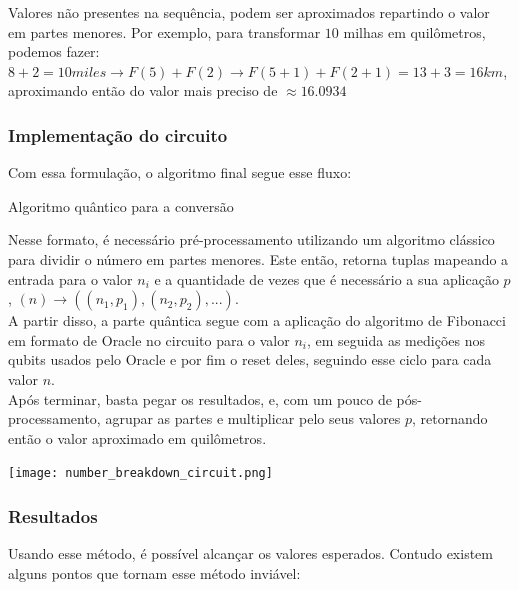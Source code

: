 \documentclass{article}
\begin{document}
Valores não presentes na sequência, podem ser aproximados repartindo o valor em partes menores. Por exemplo, para transformar $10$ milhas em quilômetros, podemos fazer: $8 + 2 = 10miles \to F(5) + F(2) \to F(5+1) + F(2+1) =  13 + 3 = 16km$, aproximando então do valor mais preciso de $\approx 16.0934$


\subsubsection{Implementação do circuito}
Com essa formulação, o algoritmo final segue esse fluxo:

\begin{algorithm}[H]
	\begin{algorithmic}
		\EndFor
			
	\end{algorithmic}
	\caption{Algoritmo quântico para a conversão}
	\label{alg:miles-to-km-quantum-algortihm}
\end{algorithm}


Nesse formato, é necessário pré-processamento utilizando um algoritmo clássico para dividir o número em partes menores. Este então, retorna tuplas mapeando a entrada para o valor $n_i$ e a quantidade de vezes que é necessário a sua aplicação $p$, $(n) \to ((n_1, p_1), (n_2, p_2), ...)$.\\
A partir disso, a parte quântica segue com a aplicação do algoritmo de Fibonacci em formato de Oracle no circuito para o valor $n_i$, em seguida as medições nos qubits usados pelo Oracle e por fim o reset deles, seguindo esse ciclo para cada valor $n$.\\
Após terminar, basta pegar os resultados, e, com um pouco de pós-processamento, agrupar as partes e multiplicar pelo seus valores $p$, retornando então o valor aproximado em quilômetros.

\begin{center}
	\texttt{[image: number\_breakdown\_circuit.png]}
	\label{fig:miles-km-circuit}
\end{center}

\subsubsection{Resultados}
Usando esse método, é possível alcançar os valores esperados. Contudo existem alguns pontos que tornam esse método inviável:
\end{document}
